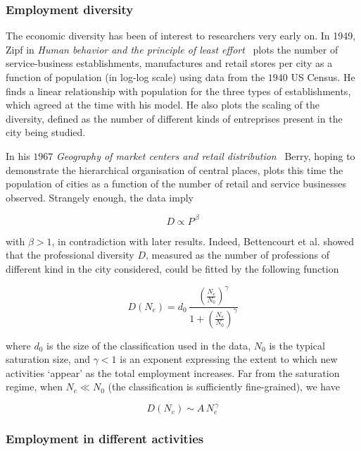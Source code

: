 \subsubsection{Employment diversity}
\label{ssub:employment_diversity}

The economic diversity has been of interest to researchers very early on. In
1949, Zipf in \emph{Human behavior and the principle of least
effort}~\cite{Zipf:1949} plots the number of service-business establishments, manufactures and
retail stores per city as a function of population (in log-log scale) using data
from the $1940$ US Census. He finds a linear relationship with population for
the three types of establishments, which agreed at the time with his model. He
also plots the scaling of the diversity, defined as the number of different kinds of
entreprises present in the city being studied. 

In his $1967$ \emph{Geography of market centers and retail
distribution}~\cite{Berry:1967} Berry, hoping to demonstrate the hierarchical
organisation of central places, plots this time the population of cities as a
function of the number of retail and service businesses observed.
Strangely enough, the data imply

\begin{equation}
    D \propto P^{\, \beta}
\end{equation}

with $\beta > 1$, in contradiction with later results. Indeed, Bettencourt et al.\cite{Bettencourt:2014} showed that the professional
diversity $D$, measured as the number of professions of different kind in the
city considered, could be fitted by the following function

\begin{equation}
    D(N_e) = d_0\, \frac{\left(\frac{N_e}{N_0}\right)^\gamma}{1+\left(\frac{N_e}{N_0}\right)^\gamma}
\end{equation}

where $d_0$ is the size of the classification used in the data, $N_0$ is the
typical saturation size, and $\gamma < 1$ is an exponent expressing the extent to
which new activities `appear' as the total employment increases. Far from the
saturation regime, when $N_e \ll N_0$ (the classification is sufficiently
fine-grained), we have 

\begin{equation}
    D(N_e) \sim A\,N_e^{\,\gamma}
\end{equation}

\subsubsection{Employment in different activities}
\label{ssub:employment_in_different_activities}

